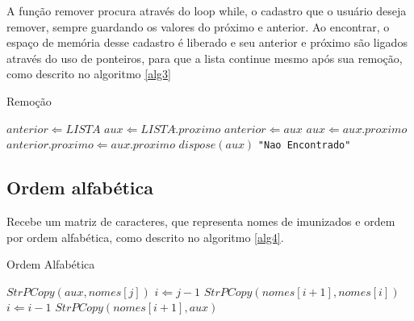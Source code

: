 \documentclass[12pt]{article}
\begin{document}
A função remover procura através do loop while, o cadastro que o usuário deseja remover, sempre
guardando os valores do próximo e anterior. Ao encontrar, o espaço de memória desse cadastro é
liberado e seu anterior e próximo são ligados através do uso de ponteiros, para que a lista continue
mesmo após sua remoção, como descrito no algoritmo \ref{alg3}

\begin{algorithm}                      %
\caption{Remoção}          %
\label{alg3}                           %
\begin{algorithmic}                    %
    \STATE $anterior \Leftarrow LISTA$
    \STATE $aux \Leftarrow LISTA\hat.proximo$
        \STATE $anterior \Leftarrow aux$
        \STATE $aux \Leftarrow aux\hat.proximo$
    \ENDWHILE
      \STATE $anterior\hat.proximo \Leftarrow aux\hat.proximo$
      \STATE $dispose(aux)$
    \ELSE
      \PRINT \texttt{"Nao Encontrado"}
    \ENDIF
\end{algorithmic}
\end{algorithm}  

\subsection{Ordem alfabética}
Recebe um matriz de caracteres, que representa nomes de imunizados e ordem por ordem
alfabética, como descrito no algoritmo \ref{alg4}.


\begin{algorithm}                      %
\caption{Ordem Alfabética}          %
\label{alg4}                           %
\begin{algorithmic}                    %
      \STATE $StrPCopy(aux, nomes[j])$
      \STATE $i \Leftarrow j-1$
        \STATE $StrPCopy(nomes[i+1], nomes[i])$
        \STATE $i \Leftarrow i -1$
      \ENDWHILE
      \STATE $StrPCopy(nomes[i+1], aux)$
    \ENDFOR
\end{algorithmic}
\end{algorithm}
\end{document}
